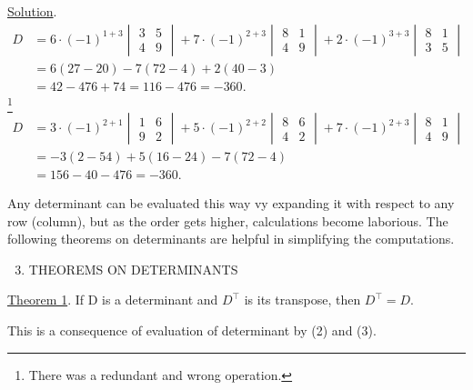 \documentclass{amsbook}
\begin{document}
\underline{Solution}.\\
\begin{align*}
D&=6\cdot(-1)^{1+3}
\begin{vmatrix}
  3 & 5 \\
  4 & 9
\end{vmatrix}
+7\cdot(-1)^{2+3}
\begin{vmatrix}
  8 & 1 \\
  4 & 9
\end{vmatrix}
+2\cdot(-1)^{3+3}
\begin{vmatrix}
  8 & 1 \\
  3 & 5
\end{vmatrix}\\
&=6(27-20)-7(72-4)+2(40-3)\\
&=42-476+74=116-476=-360.
\end{align*} \footnote{There was a redundant and wrong operation.}
\begin{align*}
D&=3\cdot(-1)^{2+1}
\begin{vmatrix}
  1 & 6 \\
  9 & 2
\end{vmatrix}
+5\cdot(-1)^{2+2}
\begin{vmatrix}
  8 & 6 \\
  4 & 2
\end{vmatrix}
+7\cdot(-1)^{2+3}
\begin{vmatrix}
  8 & 1 \\
  4 & 9
\end{vmatrix}\\
&=-3(2-54)+5(16-24)-7(72-4)\\
&=156-40-476=-360.
\end{align*}
\par Any determinant can be evaluated this way vy expanding it with respect to any row (column), but as the order gets higher, calculations become laborious. The following theorems on determinants are helpful in simplifying the computations.\\
\begin{enumerate}[label=(\Alph*)]
\setcounter{enumi}{2}
\item  THEOREMS ON DETERMINANTS
\end{enumerate}
\par \underline{Theorem 1}. If D is a determinant and $D^{\top}$ is its transpose, then $D^{\top} = D$.\\
\par This is a consequence of evaluation of determinant by (2) and (3).\\
\end{document}
